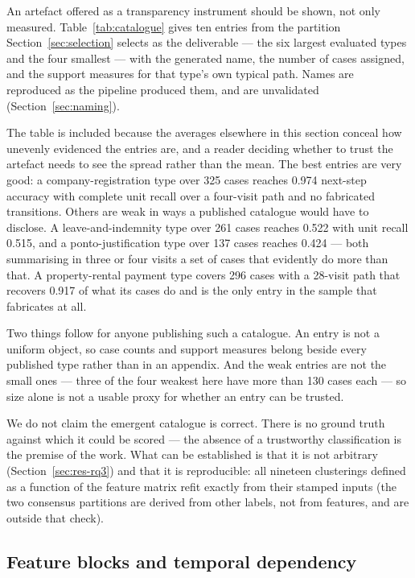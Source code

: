 An artefact offered as a transparency instrument should be shown, not only measured.
Table~\ref{tab:catalogue} gives ten entries from the partition Section~\ref{sec:selection}
selects as the deliverable --- the six largest evaluated types and the four smallest --- with
the generated name, the number of cases assigned, and the support measures for that type's own
typical path. Names are reproduced as the pipeline produced them, and are unvalidated
(Section~\ref{sec:naming}).

The table is included because the averages elsewhere in this section conceal how unevenly
evidenced the entries are, and a reader deciding whether to trust the artefact needs to see the
spread rather than the mean. The best entries are very good: a company-registration type over
325 cases reaches 0.974 next-step accuracy with complete unit recall over a four-visit path and
no fabricated transitions. Others are weak in ways a published catalogue would have to disclose.
A leave-and-indemnity type over 261 cases reaches 0.522 with unit recall 0.515, and a ponto-justification type over 137 cases reaches 0.424 --- both summarising in three or four
visits a set of cases that evidently do more than that. A property-rental payment type covers
296 cases with a 28-visit path that recovers 0.917 of what its cases do and is the only entry in
the sample that fabricates at all.

Two things follow for anyone publishing such a catalogue. An entry is not a uniform object, so
case counts and support measures belong beside every published type rather than in an appendix.
And the weak entries are not the small ones --- three of the four weakest here have more than
130 cases each --- so size alone is not a usable proxy for whether an entry can be trusted.



We do not claim the emergent catalogue is correct. There is no ground truth against which it
could be scored --- the absence of a trustworthy classification is the premise of the work.
What can be established is that it is not arbitrary (Section~\ref{sec:res-rq3}) and that it is
reproducible: all nineteen clusterings defined as a function of the feature matrix refit exactly
from their stamped inputs (the two consensus partitions are derived from other labels, not from
features, and are outside that check).



\subsection{Feature blocks and temporal dependency}\label{sec:res-ablation}


